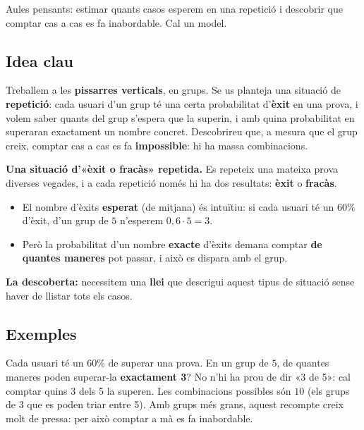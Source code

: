 %
{Aules pensants: estimar quants casos esperem en una repetició i descobrir que comptar cas a cas es fa inabordable. Cal un model.}

\subsection{Idea clau}

Treballem a les \textbf{pissarres verticals}, en grups. Se us planteja una situació de
\textbf{repetició}: cada usuari d'un grup té una certa probabilitat d'\textbf{èxit} en
una prova, i volem saber quants del grup s'espera que la superin, i amb quina
probabilitat en superaran exactament un nombre concret. Descobrireu que, a mesura que el
grup creix, comptar cas a cas es fa \textbf{impossible}: hi ha massa combinacions.

\begin{idea}
\textbf{Una situació d'«èxit o fracàs» repetida.} Es repeteix una mateixa prova diverses
vegades, i a cada repetició només hi ha dos resultats: \textbf{èxit} o \textbf{fracàs}.
\begin{itemize}[leftmargin=1.4em, itemsep=2pt]
  \item El nombre d'èxits \textbf{esperat} (de mitjana) és intuïtiu: si cada usuari té un
        $60\%$ d'èxit, d'un grup de $5$ n'esperem $0,6\cdot 5=3$.
  \item Però la probabilitat d'un nombre \textbf{exacte} d'èxits demana comptar
        \textbf{de quantes maneres} pot passar, i això es dispara amb el grup.
\end{itemize}
\textbf{La descoberta:} necessitem una \textbf{llei} que descrigui aquest tipus de
situació sense haver de llistar tots els casos.
\end{idea}

\subsection{Exemples}

\begin{exemple}
Cada usuari té un $60\%$ de superar una prova. En un grup de $5$, de quantes maneres
poden superar-la \textbf{exactament 3}? No n'hi ha prou de dir «3 de 5»: cal comptar
quins 3 dels 5 la superen. Les combinacions possibles són $10$ (els grups de 3 que es
poden triar entre 5). Amb grups més grans, aquest recompte creix molt de pressa: per això
comptar a mà es fa inabordable.
\end{exemple}

